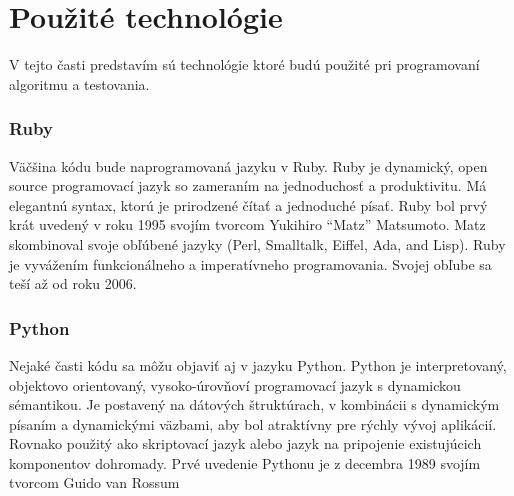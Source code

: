 \section{Použité technológie} 
V tejto časti predstavím sú technológie ktoré budú použité pri programovaní algoritmu a testovania.
\subsubsection{Ruby}
Väčšina kódu bude naprogramovaná jazyku v Ruby. Ruby je dynamický, open source programovací jazyk so zameraním na jednoduchosť a produktivitu. Má elegantnú syntax, ktorú je prirodzené čítať a jednoduché písať. Ruby bol prvý krát uvedený v roku 1995 svojím tvorcom Yukihiro “Matz” Matsumoto. Matz skombinoval svoje obľúbené jazyky (Perl, Smalltalk, Eiffel, Ada, and Lisp). Ruby je vyvážením funkcionálneho a imperatívneho programovania. 
Svojej obľube sa teší až od roku 2006.\cite{Rb} 
\subsubsection{Python} 
Nejaké časti kódu sa môžu objaviť aj v jazyku Python. Python je interpretovaný, objektovo orientovaný, vysoko-úrovňoví programovací jazyk s dynamickou sémantikou. Je postavený na dátových štruktúrach, v kombinácii s dynamickým písaním a dynamickými väzbami, aby bol atraktívny pre rýchly vývoj aplikácií. Rovnako použitý ako skriptovací jazyk alebo  jazyk na pripojenie existujúcich komponentov dohromady. Prvé uvedenie Pythonu je z decembra 1989 svojím tvorcom Guido van Rossum\cite{Pt} 

